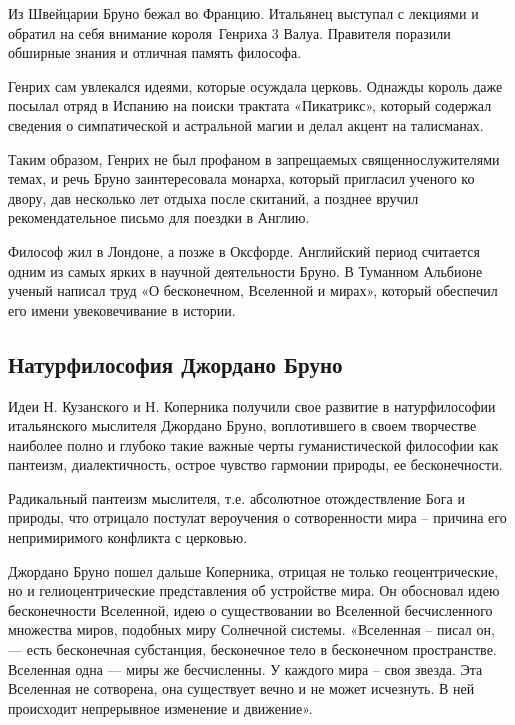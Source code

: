 \documentclass[a4paper, 14pt]{extreport}
\begin{document}
Из Швейцарии Бруно бежал во Францию. Итальянец выступал с лекциями и
обратил на себя внимание короля~Генриха 3 Валуа. Правителя поразили
обширные знания и отличная память философа.

Генрих сам увлекался идеями, которые осуждала церковь. Однажды король
даже посылал отряд в Испанию на поиски трактата «Пикатрикс», который
содержал сведения о симпатической и астральной магии и делал акцент на
талисманах.

Таким образом, Генрих не был профаном в запрещаемых священнослужителями
темах, и речь Бруно заинтересовала монарха, который пригласил ученого ко
двору, дав несколько лет отдыха после скитаний, а позднее вручил
рекомендательное письмо для поездки в Англию.

Философ жил в Лондоне, а позже в Оксфорде. Английский период считается
одним из самых ярких в научной деятельности Бруно. В Туманном Альбионе
ученый написал труд «О бесконечном, Вселенной и мирах», который
обеспечил его имени увековечивание в истории.

\subsection{Натурфилософия Джордано Бруно}

Идеи Н. Кузанского и Н. Коперника получили свое развитие в
натурфилософии итальянского мыслителя Джордано Бруно, воплотившего в
своем творчестве наиболее полно и глубоко такие важные черты
гуманистической философии как пантеизм, диалектичность, острое чувство
гармонии природы, ее бесконечности.

Радикальный пантеизм мыслителя, т.е. абсолютное отождествление Бога и
природы, что отрицало постулат вероучения о сотворенности мира --
причина его непримиримого конфликта с церковью.

Джордано Бруно пошел дальше Коперника, отрицая не только
геоцентрические, но и гелиоцентрические представления об устройстве
мира. Он обосновал идею бесконечности Вселенной, идею о существовании во
Вселенной бесчисленного множества миров, подобных миру Солнечной
системы. «Вселенная -- писал он, --- есть бесконечная субстанция,
бесконечное тело в бесконечном пространстве. Вселенная одна --- миры же
бесчисленны. У каждого мира -- своя звезда. Эта Вселенная не сотворена,
она существует вечно и не может исчезнуть. В ней происходит непрерывное
изменение и движение».
\end{document}
